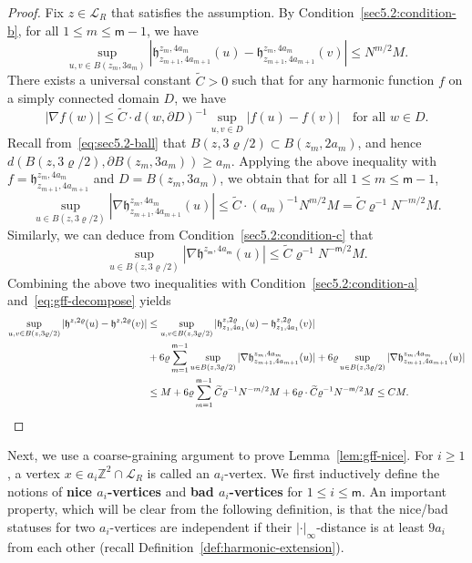 \documentclass[a4paper]{article}
\numberwithin{equation}{section}
\numberwithin{equation}{section}
\renewcommand{\1}{\mathbf{1}}
\begin{document}
\begin{proof}
Fix $z \in \mathscr{L}_R$ that satisfies the assumption. By Condition~\eqref{sec5.2:condition-b}, for all $1 \leq m \leq \mathsf{m} - 1$, we have
$$
\sup_{u,v \in B(z_m, 3a_m)} |\mathfrak h^{z_m, 4a_m}_{z_{m+1}, 4a_{m+1}}(u) - \mathfrak h^{z_m, 4a_m}_{z_{m+1}, 4a_{m+1}}(v)| \leq N^{m/2} M.
$$
There exists a universal constant $\widetilde C>0$ such that for any harmonic function $f$ on a simply connected domain $D$, we have
$$
|\nabla f(w)| \leq \widetilde C \cdot d(w, \partial D)^{-1} \sup_{u,v \in D} |f(u) - f(v)| \quad \mbox{for all } w \in D.
$$
Recall from~\eqref{eq:sec5.2-ball} that $B(z,3\varrho/2) \subset B(z_m, 2 a_m)$, and hence $d(B(z,3\varrho/2), \partial B(z_m, 3a_m)) \geq a_m$. Applying the above inequality with $f=\mathfrak h^{z_m, 4a_m}_{ z_{m+1}, 4a_{m+1}}$ and $D = B(z_m, 3a_m)$, we obtain that for all $1 \leq m \leq \mathsf{m} - 1$,
$$
\sup_{u \in B(z, 3\varrho/2)} |\nabla \mathfrak h^{z_m, 4a_m}_{z_{m+1}, 4a_{m+1}}(u)| \leq \widetilde C \cdot (a_m)^{-1} N^{m/2} M = \widetilde C \varrho^{-1} N^{-m/2}M .
$$
Similarly, we can deduce from Condition~\eqref{sec5.2:condition-c} that
$$
\sup_{u \in B(z, 3\varrho/2)} |\nabla \mathfrak h^{z_{\mathsf m}, 4a_{\mathsf m}}(u)| \leq \widetilde C \varrho^{-1} N^{-\mathsf m/2}M .
$$
Combining the above two inequalities with Condition~\eqref{sec5.2:condition-a} and~\eqref{eq:gff-decompose} yields
\begin{align*}
    \sup_{u,v \in B(z, 3\varrho/2)} | \mathfrak h^{z, 2\varrho} (u) - \mathfrak h^{z, 2\varrho} (v)| &\leq \sup_{u,v \in B(z, 3\varrho/2)} | \mathfrak h^{z, 2\varrho}_{z_1, 4a_1} (u) - \mathfrak h^{z,2\varrho}_{z_1, 4a_1} (v)| \\
    &+6\varrho \sum_{m=1}^{\mathsf m-1} \sup_{u \in B(z, 3\varrho/2)} |\nabla \mathfrak h^{z_m, 4a_m}_{z_{m+1}, 4a_{m+1}}(u)| + 6\varrho \sup_{u \in B(z, 3\varrho/2)} |\nabla \mathfrak h^{z_m, 4a_m}_{z_{m+1}, 4a_{m+1}}(u)|  \\
    &\leq M + 6 \varrho \sum_{m=1}^{\mathsf m-1} \widetilde C \varrho^{-1} N^{-m/2}M + 6 \varrho \cdot \widetilde C \varrho^{-1} N^{-\mathsf m/2} M \leq C M. \qedhere
\end{align*}
\end{proof}


Next, we use a coarse-graining argument to prove Lemma~\ref{lem:gff-nice}. For $i \geq 1$, a vertex $x \in a_i \mathbb{Z}^2 \cap \mathscr{L}_R$ is called an $a_i$-vertex. We first inductively define the notions of \textbf{nice $a_i$-vertices} and \textbf{bad $a_i$-vertices} for $1 \leq i \leq \mathsf{m}$. An important property, which will be clear from the following definition, is that the nice/bad statuses for two $a_i$-vertices are independent if their $|\cdot|_\infty$-distance is at least $9 a_i$ from each other (recall Definition~\ref{def:harmonic-extension}).
\end{document}

